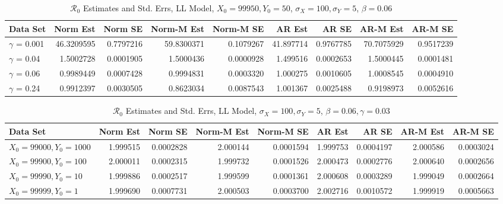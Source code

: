\documentclass[12pt]{article}
\newcommand{\rr}{\ensuremath{\mathcal{R}_0}}
\begin{document}
\begin{table}[H]
	
	\caption{\label{tab:}$\rr$ Estimates and Std. Errs, LL Model,
		$X_0 = 99950, Y_0 = 50$, $\sigma_X = 100, \sigma_Y = 5$, $\beta = 0.06$}
	\centering
	\begin{footnotesize}
		\begin{tabular}[t]{l|r|r|r|r|r|r|r|r}
			\hline
			Data Set & Norm Est & Norm SE & Norm-M Est & Norm-M SE & AR Est & AR SE & AR-M Est & AR-M SE\\
			\hline
			$\gamma$ = 0.001 & 46.3209595 & 0.7797216 & 59.8300371 & 0.1079267 & 41.897714 & 0.9767785 & 70.7075929 & 0.9517239\\
			\hline
			$\gamma$ = 0.04 & 1.5002728 & 0.0001905 & 1.5000436 & 0.0000928 & 1.499516 & 0.0002653 & 1.5000445 & 0.0001481\\
			\hline
			$\gamma$ = 0.06 & 0.9989449 & 0.0007428 & 0.9994831 & 0.0003320 & 1.000275 & 0.0010605 & 1.0008545 & 0.0004910\\
			\hline
			$\gamma$ = 0.24 & 0.9912397 & 0.0030505 & 0.8623034 & 0.0087543 & 1.001367 & 0.0025488 & 0.9198973 & 0.0052616\\
			\hline
		\end{tabular}
	\end{footnotesize}
\end{table}

\begin{table}[H]
	
	\caption{\label{tab:}$\rr$ Estimates and Std. Errs, LL Model,
		$\sigma_X = 100, \sigma_Y = 5$, $\beta = 0.06, \gamma = 0.03$}
	\centering
	\begin{footnotesize}
		\begin{tabular}[t]{l|r|r|r|r|r|r|r|r}
			\hline
			Data Set & Norm Est & Norm SE & Norm-M Est & Norm-M SE & AR Est & AR SE & AR-M Est & AR-M SE\\
			\hline
			$X_0 = 99000, Y_0 = 1000$ & 1.999515 & 0.0002828 & 2.000144 & 0.0001594 & 1.999753 & 0.0004197 & 2.000586 & 0.0003024\\
			\hline
			$X_0 = 99900, Y_0 = 100$ & 2.000011 & 0.0002315 & 1.999732 & 0.0001526 & 2.000473 & 0.0002776 & 2.000640 & 0.0002656\\
			\hline
			$X_0 = 99990, Y_0 = 10$ & 1.999886 & 0.0002517 & 1.999599 & 0.0001361 & 2.000608 & 0.0003289 & 1.999049 & 0.0002664\\
			\hline
			$X_0 = 99999, Y_0 = 1$ & 1.999690 & 0.0007731 & 2.000503 & 0.0003700 & 2.002716 & 0.0010572 & 1.999919 & 0.0005663\\
			\hline
		\end{tabular}
	\end{footnotesize}
\end{table}
\end{document}
